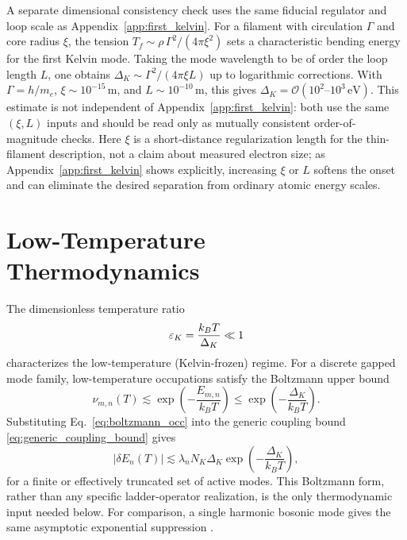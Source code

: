 \documentclass[pdflatex,sn-mathphys-num]{sn-jnl}
\begin{document}
        A separate dimensional consistency check uses the same fiducial regulator and loop scale as Appendix~\ref{app:first_kelvin}. For a filament with circulation $\Gamma$ and core radius $\xi$, the tension $T_f \sim \rho \, \Gamma^2/(4\pi \xi^2)$ sets a characteristic bending energy for the first Kelvin mode. Taking the mode wavelength to be of order the loop length $L$, one obtains $\Delta_K \sim \Gamma^2/(4\pi \xi L)$ up to logarithmic corrections. With $\Gamma = h/m_e$, $\xi \sim 10^{-15}\,\mathrm{m}$, and $L \sim 10^{-10}\,\mathrm{m}$, this gives $\Delta_K = \mathcal{O}(10^2\text{--}10^3\,\mathrm{eV})$. This estimate is not independent of Appendix~\ref{app:first_kelvin}: both use the same $(\xi,L)$ inputs and should be read only as mutually consistent order-of-magnitude checks. Here $\xi$ is a short-distance regularization length for the thin-filament description, not a claim about measured electron size; as Appendix~\ref{app:first_kelvin} shows explicitly, increasing $\xi$ or $L$ softens the onset and can eliminate the desired separation from ordinary atomic energy scales.

    \section{Low-Temperature Thermodynamics}\label{sec:lowT}
        The dimensionless temperature ratio
        \[
            \varepsilon_K = \frac{k_B T}{\Delta_K} \ll 1
        \]
        characterizes the low-temperature (Kelvin-frozen) regime. For a discrete gapped mode family, low-temperature occupations satisfy the Boltzmann upper bound
        \begin{equation}
            \nu_{m,n}(T) \lesssim \exp\!\left(-\frac{E_{m,n}}{k_B T}\right)
            \le
            \exp\!\left(-\frac{\Delta_K}{k_B T}\right).
            \label{eq:boltzmann_occ}
        \end{equation}
        Substituting Eq.~\eqref{eq:boltzmann_occ} into the generic coupling bound \eqref{eq:generic_coupling_bound} gives
        \begin{equation}
            |\delta E_n(T)|
            \lesssim
            \lambda_n N_K \Delta_K
            \exp\!\left(-\frac{\Delta_K}{k_B T}\right),
            \label{eq:deltaE_boltzmann}
        \end{equation}
        for a finite or effectively truncated set of active modes. This Boltzmann form, rather than any specific ladder-operator realization, is the only thermodynamic input needed below. For comparison, a single harmonic bosonic mode gives the same asymptotic exponential suppression \cite{Pathria2011}.
\end{document}
